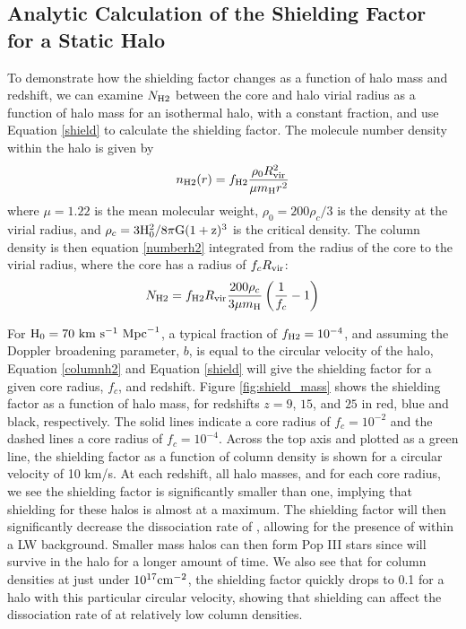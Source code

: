 \documentclass[a4paper,fleqn,usenatbib]{mnras}
\begin{document}
\subsection{Analytic Calculation of the Shielding Factor for a Static Halo}
To demonstrate how the shielding factor changes as a function of halo mass and redshift, we can examine $N_{\rm H2}$ between the core and halo virial radius as a function of halo mass for an isothermal halo, with a constant \hh{} fraction, and use Equation \ref{shield} to calculate the shielding factor. The \hh{} molecule number density within the halo is given by 
\begin{equation} \label{numberh2}
	n_{\rm H2}(r) = f_{\rm H2} \frac{\rho_{0}R^{2}_{\rm vir}}{\mu m_{\rm H} r^{2}}
\end{equation}
where $\mu = 1.22$ is the mean molecular weight, $\rho_{0} = 200 \rho_{c} / 3$ is the density at the virial radius, and $\rho_{c} = 3 \rm{H}_{0}^{2} / 8 \pi \rm{G} (1+z)^3$ is the critical density. The column density is then equation \ref{numberh2} integrated from the radius of the core to the virial radius, where the core has a radius of $f_{c} R_{\rm vir}$: 
\begin{equation} \label{columnh2}
	N_{\rm H2} = f_{\rm H2} R_{\rm vir} \frac{200 \rho_{c}}{3 \mu m_{\rm H}} \left(\frac{1}{f_{c}} - 1 \right)
\end{equation}

For $\rm{H}_{0} = 70 \ \rm{km} \ \rm{s}^{-1} \ \rm{Mpc}^{-1}$, a typical \hh{} fraction of $f_{\rm H2} = 10^{-4}$, and assuming the Doppler broadening parameter, $b$, is equal to the circular velocity of the halo, Equation \ref{columnh2} and Equation \ref{shield} will give the shielding factor for a given core radius, $f_{c}$, and redshift. Figure \ref{fig:shield_mass} shows the shielding factor as a function of halo mass, for redshifts $z = 9$, $15$, and $25$ in red, blue and black, respectively. The solid lines indicate a core radius of $f_{c} = 10^{-2}$ and the dashed lines a core radius of $f_{c} = 10^{-4}$. Across the top axis and plotted as a green line, the shielding factor as a function of \hh{} column density is shown for a circular velocity of 10 km/s. At each redshift, all halo masses, and for each core radius, we see the shielding factor is significantly smaller than one, implying that \hh{} shielding for these halos is almost at a maximum. The shielding factor will then significantly decrease the dissociation rate of \hh{}, allowing for the presence of \hh{} within a LW background. Smaller mass halos can then form Pop III stars since \hh{} will survive in the halo for a longer amount of time. We also see that for column densities at just under $10^{17} \rm cm^{-2}$, the shielding factor quickly drops to 0.1 for a halo with this particular circular velocity, showing that \hh{} shielding can affect the dissociation rate of \hh{} at relatively low column densities.
\end{document}
